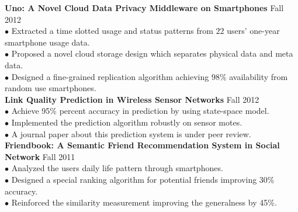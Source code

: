 \documentclass[margin, centered]{resume}
\begin{document}
\begin{resume}
	\textbf{Uno: A Novel Cloud Data Privacy Middleware on Smartphones} \hfill Fall 2012\\
	$\bullet$ Extracted a time slotted usage and status patterns from $22$ users' one-year smartphone usage data.\\
	$\bullet$ Proposed a novel cloud storage design which separates physical data and meta data.\\
	$\bullet$ Designed a fine-grained replication algorithm achieving $98\%$ availability from random use smartphones. \vspace{-6mm}\\
	
	\textbf{Link Quality Prediction in Wireless Sensor Networks} \hfill Fall 2012\\
	$\bullet$ Achieve 95\% percent accuracy in prediction by using state-space model.\\
	$\bullet$ Implemented the prediction algorithm robustly on sensor motes.\\
	$\bullet$ A journal paper about this prediction system is under peer review. \vspace{-6mm}\\
	
	\textbf{Friendbook: A Semantic Friend Recommendation System in Social Network} \hfill Fall 2011\\
	$\bullet$ Analyzed the users daily life pattern through smartphones.  \vspace{0mm}\\%
	$\bullet$ Designed a special ranking algorithm for potential friends improving 30\% accuracy. \vspace{0mm}\\%
	$\bullet$ Reinforced the similarity measurement improving the generalness by 45\%.\vspace{-5mm}\\


\end{resume}
\end{document}
